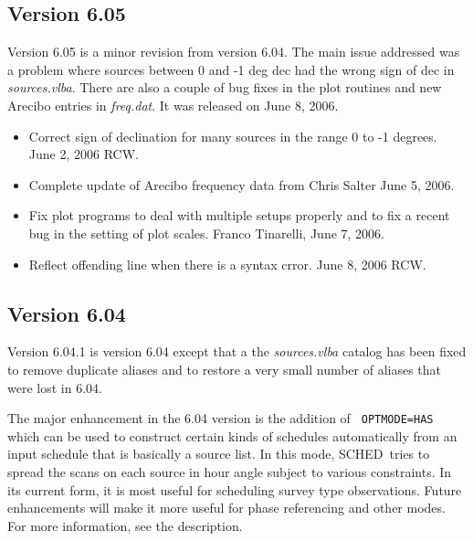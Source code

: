 \documentclass{report}
\newcommand{\schedb}{{\sc SCHED~}}
\begin{document}
\subsection{\label{SSEC:VER_6.05}Version 6.05}

Version 6.05 is a minor revision from version 6.04.  The main issue
addressed was a problem where sources between 0 and -1 deg dec had the
wrong sign of dec in {\sl sources.vlba}.  There are also a couple of
bug fixes in the plot routines and new Arecibo entries in {\sl
freq.dat}.  It was released on June 8, 2006.

\begin{itemize}

\item Correct sign of declination for many sources in the range 0 to -1 degrees.
June 2, 2006 RCW.

\item Complete update of Arecibo frequency data from Chris Salter  June 5, 2006.

\item Fix plot programs to deal with multiple setups properly and to fix a recent
bug in the setting of plot scales.  Franco Tinarelli, June 7, 2006.

\item Reflect offending line when there is a syntax crror.  June 8, 2006  RCW.

\end{itemize}


\subsection{\label{SSEC:VER_6.04}Version 6.04}

Version 6.04.1 is version 6.04 except that a the {\sl sources.vlba}
catalog has been fixed to remove duplicate aliases and to restore a
very small number of aliases that were lost in 6.04.

The major enhancement in the 6.04 version is the addition of {\tt
OPTMODE=HAS} which can be used to construct certain kinds of schedules
automatically from an input schedule that is basically a source list.
In this mode, \schedb tries to spread the scans on each source in
hour angle subject to various constraints.  In its current form, it is most
useful for scheduling survey type observations.  Future enhancements
will make it more useful for phase referencing and other modes.  For
more information, see the  description.
\end{document}
